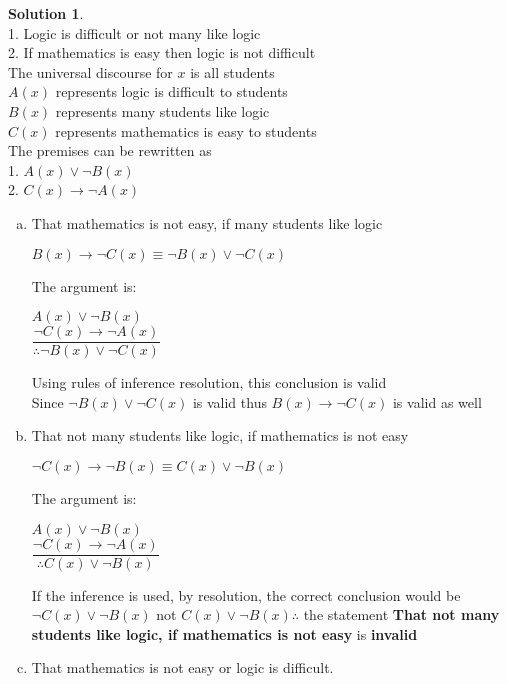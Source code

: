 \documentclass{article}
\theoremstyle{definition}
\newtheorem*{solution}{Solution}
\begin{document}
\begin{solution}\ \\
1. Logic is difficult or not many like logic \\
2. If mathematics is easy then logic is not difficult \\
The universal discourse for $x$ is all students \\
$A(x)$ represents logic is difficult to students \\
$B(x)$ represents many students like logic \\
$C(x)$ represents mathematics is easy to students \\
The premises can be rewritten as \\
1. $A(x) \vee \neg B(x)$ \\
2. $C(x) \rightarrow \neg A(x)$
\begin{enumerate}[a)]
\item That mathematics is not easy, if many students like logic

      $B(x) \rightarrow \neg C(x) \equiv \neg B(x) \vee \neg C(x)$

      The argument is:

      $A(x) \vee \neg B(x)$ \\
      $\displaystyle \dfrac{\neg C(x) \rightarrow \neg A(x)}{\therefore \neg B(x) \vee \neg C(x)}$

      Using rules of inference resolution, this conclusion is valid \\
      Since $\neg B(x) \vee \neg C(x)$ is valid thus $B(x) \rightarrow \neg C(x)$ is valid as well

\item That not many students like logic, if mathematics is not easy

      $\neg C(x) \rightarrow \neg B(x) \equiv C(x) \vee \neg B(x)$

      The argument is:

      $A(x) \vee \neg B(x)$ \\
      $\displaystyle \dfrac{\neg C(x) \rightarrow \neg A(x)}{\therefore C(x) \vee \neg B(x)}$

      If the inference is used, by resolution, the correct conclusion would be $\neg C(x) \vee \neg B(x)$ not $C(x)
      \vee \neg B(x) \therefore$ the statement \textbf{That not many students like logic, if mathematics is not easy}
      is \textbf{invalid}

\item That mathematics is not easy or logic is difficult.


\end{enumerate}
\end{solution}
\end{document}
